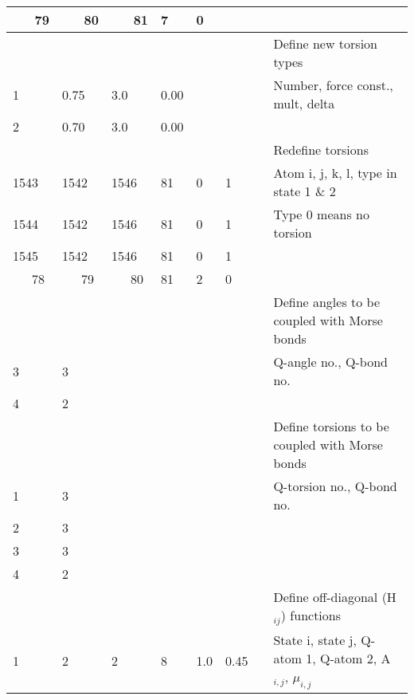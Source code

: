 \documentclass[a4paper,10pt]{article}
\begin{document}
\begin{longtable}{|p{35pt} p{35pt} p{35pt} p{35pt} p{35pt} p{35pt} p{35pt}| p{100pt}|}
  \hline~~~79 &~~~80 &~~~81 & 7 & 0        &  &  & \\
  \hline [torsion{\_}types] &     &  &  &  &  &  & Define new torsion types \\
  \hline 1 & 0.75 & 3.0 & 0.00          &  &  &  & Number, force const., mult, delta \\
  \hline 2 & 0.70 & 3.0 & 0.00          &  &  &  & \\
  \hline [change{\_}torsions] &   &  &  &  &  &  & Redefine torsions \\
  \hline 1543 & 1542 & 1546 & 81 & 0 & 1      &  & Atom i, j, k, l, type in state 1 \& 2 \\
  \hline 1544 & 1542 & 1546 & 81 & 0 & 1      &  & Type 0 means no torsion \\
  \hline 1545 & 1542 & 1546 & 81 & 0 & 1      &  & \\
  \hline ~~~78   & ~~~79 & ~~~80 & 81 & 2 & 0      &  & \\
  \hline [angle{\_}couplings] &   &  &  &  &  &  & Define angles to be coupled with Morse bonds \\
  \hline 3 & 3                    &  &  &  &  &  & Q-angle no., Q-bond no. \\
  \hline 4 & 2                    &  &  &  &  &  & \\
  \hline [torsion{\_}couplings]&  &  &  &  &  &  & Define torsions to be coupled with Morse bonds \\
  \hline 1 & 3                    &  &  &  &  &  & Q-torsion no., Q-bond no. \\
  \hline 2 & 3                    &  &  &  &  &  & \\
  \hline 3 & 3                    &  &  &  &  &  & \\
  \hline 4 & 2                    &  &  &  &  &  & \\
  \hline [off{\_}diagonals]    &  &  &  &  &  &  & Define off-diagonal (H$_{ij}$) functions \\
  \hline 1 & 2 & 2 & 8 & 1.0 & 0.45           &  & State i, state j, Q-atom 1, Q-atom 2, A$_{i,j}$, $\mu_{i,j}$ \\ \hline
\end{longtable}
\normalsize
\end{document}
